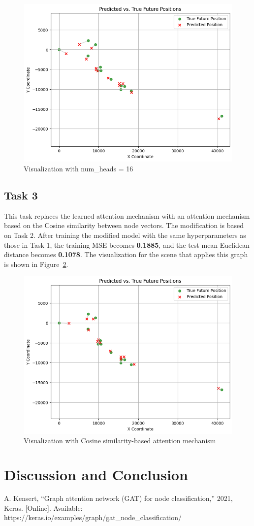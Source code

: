 \documentclass[conference]{IEEEtran}
\begin{document}
\begin{figure}[htbp]
    \centering
    \includegraphics[width=0.8\linewidth]{figvisual2.png}
    \caption{Visualization with num\_heads = 16}
    \label{fig:visual2}
\end{figure}

\subsection*{Task 3}

This task replaces the learned attention mechanism with an attention mechanism
based on the Cosine similarity between node vectors. The modification is based
on Task 2. After training the modified model with the same hyperparameters as
those in Task 1, the training MSE becomes \textbf{0.1885}, and the test mean
Euclidean distance becomes \textbf{0.1078}. The visualization for the scene
that applies this graph is shown in Figure~\ref{fig:visual3}.

\begin{figure}[htbp]
    \centering
    \includegraphics[width=0.8\linewidth]{figvisual3.png}
    \caption{Visualization with Cosine similarity-based attention mechanism}
    \label{fig:visual3}
\end{figure}

\section{Discussion and Conclusion}



\begin{thebibliography}{00}
 A. Kensert, “Graph attention network (GAT) for node
    classification,” 2021, Keras. [Online]. Available:
    https://keras.io/examples/graph/gat\_node\_classification/
\end{thebibliography}
\end{document}
